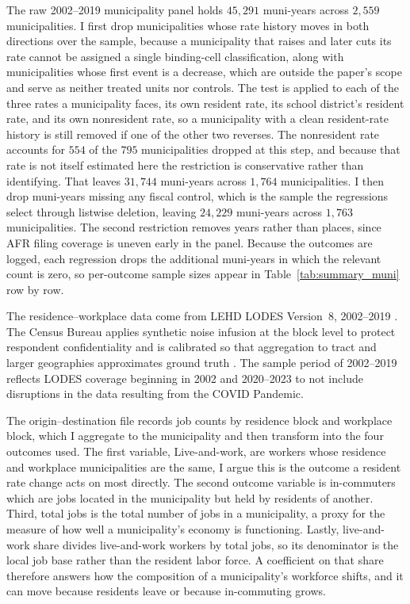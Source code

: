 \documentclass[12pt]{article}
\begin{document}
The raw 2002--2019 municipality panel holds
$45{,}291$ muni-years across $2{,}559$ municipalities. I first drop
municipalities whose rate history moves in both directions over the
sample, because a municipality that raises and later cuts its rate cannot
be assigned a single binding-cell classification, along with
municipalities whose first event is a decrease, which are outside the
paper's scope and serve as neither treated units nor controls. The test
is applied to each of the three rates a municipality faces, its own
resident rate, its school district's resident rate, and its own
nonresident rate, so a municipality with a clean resident-rate history is
still removed if one of the other two reverses. The nonresident rate
accounts for $554$ of the $795$ municipalities dropped at this step, and
because that rate is not itself estimated here the restriction is
conservative rather than identifying. That
leaves $31{,}744$ muni-years across $1{,}764$ municipalities. I then drop
muni-years missing any fiscal control, which is the sample the regressions
select through listwise deletion, leaving $24{,}229$ muni-years across
$1{,}763$ municipalities. The second restriction removes years rather than
places, since AFR filing coverage is uneven early in the panel. Because
the outcomes are logged, each regression drops the additional muni-years
in which the relevant count is zero, so per-outcome sample sizes appear in
Table~\ref{tab:summary_muni} row by row.

The residence--workplace data come from LEHD LODES Version~8,
2002--2019 \citep{lehdLODES}. The Census Bureau applies
synthetic noise infusion at the block level to protect respondent
confidentiality and is calibrated so that aggregation to tract and larger
geographies approximates ground truth
\citep{grahamDESIGNCOMPARISONLODES}. The sample period of 2002--2019
reflects LODES coverage beginning in 2002 and
2020--2023 to not include disruptions in the data resulting from the COVID Pandemic.

The origin--destination file records job counts by residence block and
workplace block, which I aggregate to the municipality and then transform into the
four outcomes used. The first variable, Live-and-work, are workers whose residence
and workplace municipalities are the same, I argue this is the outcome a resident rate change
acts on most directly. The second outcome variable is in-commuters which are jobs located in the municipality
but held by residents of another. Third, total jobs is the total number of jobs in a municipality, a proxy for the measure of how well a municipality's economy is functioning. Lastly, live-and-work
share divides live-and-work workers by total jobs, so its denominator is
the local job base rather than the resident labor force. A coefficient on
that share therefore answers how the composition of a municipality's
workforce shifts, and it can move because residents leave or because
in-commuting grows.
\end{document}
